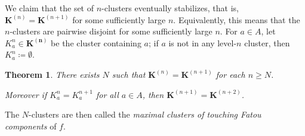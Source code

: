 \documentclass{amsart}
\theoremstyle{plain}
\newtheorem{theorem}{Theorem}[section]
\theoremstyle{definition}
\theoremstyle{remark}
\begin{document}
We claim that the set of $n$-clusters eventually stabilizes, that is, $\mathbf{K}^{(n)}= \mathbf{K}^{(n+1)}$ for some sufficiently large $n$.  Equivalently, this means that the $n$-clusters are pairwise disjoint for some sufficiently large $n$. For $a\in A$, let $K^n_a\in \mathbf {K^{(n)}}$ be the cluster containing $a$; if $a$ is not in any level-$n$ cluster, then $K^n_a\coloneq \emptyset$. 

\begin{theorem}\label{thm: max_clusters_exist}
There exists $N$ such that $\mathbf{K}^{(n)}= \mathbf{K}^{(n+1)}$ for each $n\geq N$. 

Moreover if $K^n_a = K^{n+1}_a$ for all $a\in A$, then $\mathbf{K}^{(n+1)}= \mathbf{K}^{(n+2)}$.
\end{theorem}

The $N$-clusters are then called the  \emph{maximal clusters of touching Fatou components} of $f$.
\end{document}
